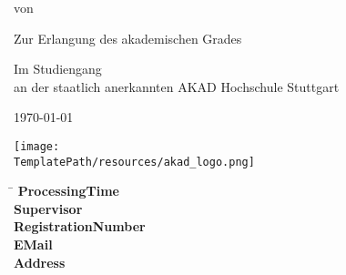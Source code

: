 \begin{titlepage}
\begin{center}
\thispagestyle{empty}

\Large{\textbf{\Title}}
\vspace{1cm}
\onehalfspacing

\large{\Module}

\vspace{1cm}
\normalsize

von

\vspace{.5cm} 
\large{\Name}
\normalsize
\vspace{1cm}

\ifassignment
\else
Zur Erlangung des akademischen Grades \\
\textbf{\Degree}
\vspace{1cm}
\fi

Im Studiengang \CourseOfStudy \\
an der staatlich anerkannten AKAD Hochschule Stuttgart
\vspace{2cm}

\today

\vspace{2cm}

\texttt{[image: \\TemplatePath/resources/akad\_logo.png]}

\end{center}

\vfill
\begin{spacing}{1.2}
    \begin{tabbing}
	    \hspace{9cm}     \= \kill
	    \textbf{ProcessingTime}  \>  \ProcessingTime \\
	    \textbf{Supervisor}              \>  \Supervisor \\
	    \textbf{RegistrationNumber}  \>  \RegistrationNumber \\
	    \textbf{EMail}		\> \href{mailto:\Email}{\Email} \\
	    \textbf{Address}		\> \Address \\
	    		\> \City
	\end{tabbing}
\end{spacing}
\restoregeometry
\end{titlepage}